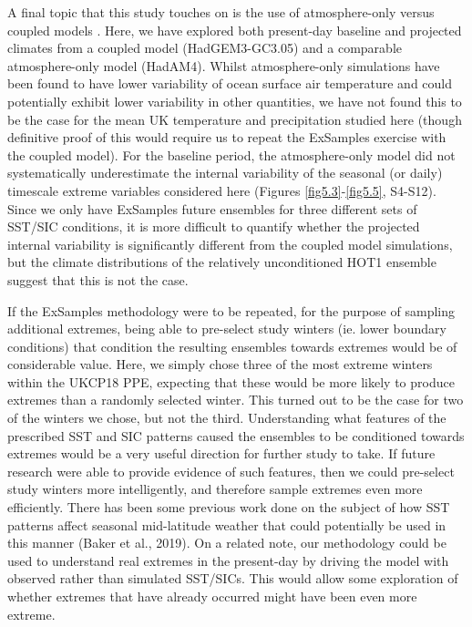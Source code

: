   A final topic that this study touches on is the use of atmosphere-only versus coupled models \citep{barsugli_basic_1998,dong_attribution_2017,fischer_biased_2018,he_does_2016}. Here, we have explored both present-day baseline and projected climates from a coupled model (HadGEM3-GC3.05) and a comparable atmosphere-only model (HadAM4). Whilst atmosphere-only simulations have been found to have lower variability of ocean surface air temperature \citep{barsugli_basic_1998} and could potentially exhibit lower variability in other quantities, we have not found this to be the case for the mean UK temperature and precipitation studied here (though definitive proof of this would require us to repeat the ExSamples exercise with the coupled model). For the baseline period, the atmosphere-only model did not systematically underestimate the internal variability of the seasonal (or daily) timescale extreme variables considered here (Figures \ref{fig5.3}-\ref{fig5.5}, S4-S12). Since we only have ExSamples future ensembles for three different sets of SST/SIC conditions, it is more difficult to quantify whether the projected internal variability is significantly different from the coupled model simulations, but the climate distributions of the relatively unconditioned HOT1 ensemble suggest that this is not the case.
  
  If the ExSamples methodology were to be repeated, for the purpose of sampling additional extremes, being able to pre-select study winters (ie. lower boundary conditions) that condition the resulting ensembles towards extremes would be of considerable value. Here, we simply chose three of the most extreme winters within the UKCP18 PPE, expecting that these would be more likely to produce extremes than a randomly selected winter. This turned out to be the case for two of the winters we chose, but not the third. Understanding what features of the prescribed SST and SIC patterns caused the ensembles to be conditioned towards extremes would be a very useful direction for further study to take. If future research were able to provide evidence of such features, then we could pre-select study winters more intelligently, and therefore sample extremes even more efficiently. There has been some previous work done on the subject of how SST patterns affect seasonal mid-latitude weather that could potentially be used in this manner (Baker et al., 2019). On a related note, our methodology could be used to understand real extremes in the present-day by driving the model with observed rather than simulated SST/SICs. This would allow some exploration of whether extremes that have already occurred might have been even more extreme.
  
